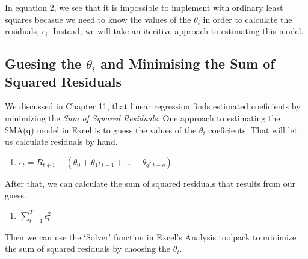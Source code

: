 \documentclass[
  letterpaper,
  DIV=11,
  numbers=noendperiod]{scrreprt}
\providecommand{\tightlist}{%
  \setlength{\itemsep}{0pt}\setlength{\parskip}{0pt}}\usepackage{longtable,booktabs,array}
\begin{document}
In equation 2, we see that it is impossible to implement with ordinary
least squares becasue we need to know the values of the \(\theta_i\) in
order to calculate the residuals, \(\epsilon_i\). Instead, we will take
an iteritive approach to estimating this model.

\hypertarget{guesing-the-theta_i-and-minimising-the-sum-of-squared-residuals}{%
\subsection{\texorpdfstring{Guesing the \(\theta_i\) and Minimising the
Sum of Squared
Residuals}{Guesing the \textbackslash theta\_i and Minimising the Sum of Squared Residuals}}\label{guesing-the-theta_i-and-minimising-the-sum-of-squared-residuals}}

We discussed in Chapter 11, that linear regression finds estimated
coeficients by minimizing the \emph{Sum of Squared Residuals}. One
approach to estimating the \$MA(q) model in Excel is to guess the values
of the \(\theta_i\) coeficients. That will let us calculate residuals by
hand.

\begin{enumerate}
\def\labelenumi{\arabic{enumi}.}
\setcounter{enumi}{2}
\tightlist
\item
  \(\epsilon_{t} = R_{t+1} - (\theta_0 + \theta_1\epsilon_{t-1} + ... + \theta_q\epsilon_{t-q})\)
\end{enumerate}

After that, we can calculate the sum of squared residuals that results
from our guess.

\begin{enumerate}
\def\labelenumi{\arabic{enumi}.}
\setcounter{enumi}{3}
\tightlist
\item
  \(\sum_{t=1}^{T} \epsilon_t^2\)
\end{enumerate}

Then we can use the `Solver' function in Excel's Analysis toolpack to
minimize the sum of squared residuals by choosing the \(\theta_i\).
\end{document}
